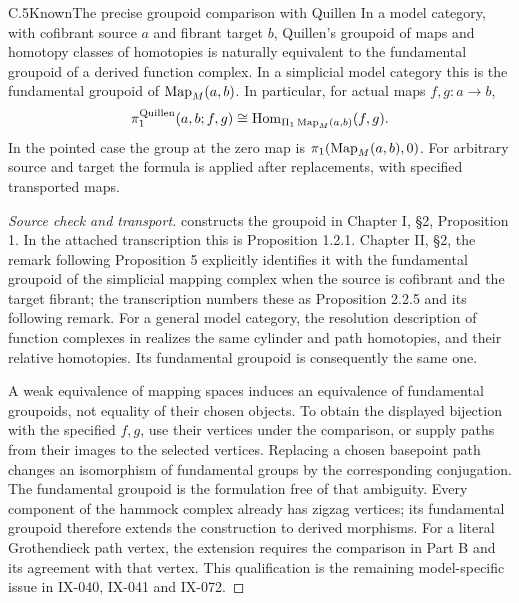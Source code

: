 \begin{result}{C.5}{Known}{The precise groupoid comparison with Quillen}
In a model category, with cofibrant source $a$ and fibrant target $b$, Quillen's groupoid of maps and homotopy classes of homotopies is naturally equivalent to the fundamental groupoid of a derived function complex. In a simplicial model category this is the fundamental groupoid of $\operatorname{Map}_M(a,b)$. In particular, for actual maps $f,g:a\to b$,
\[
 \pi_1^{\mathrm{Quillen}}(a,b;f,g)
 \cong\operatorname{Hom}_{\Pi_1\operatorname{Map}_M(a,b)}(f,g).
\]
In the pointed case the group at the zero map is $\pi_1(\operatorname{Map}_M(a,b),0)$. For arbitrary source and target the formula is applied after replacements, with specified transported maps.
\end{result}
\begin{proof}[Source check and transport]
\citet{Quillen1967} constructs the groupoid in Chapter I, \S2, Proposition 1. In the attached transcription this is Proposition 1.2.1. Chapter II, \S2, the remark following Proposition 5 explicitly identifies it with the fundamental groupoid of the simplicial mapping complex when the source is cofibrant and the target fibrant; the transcription numbers these as Proposition 2.2.5 and its following remark. For a general model category, the resolution description of function complexes in \citet[Proposition 4.4]{DwyerKan1980Function} realizes the same cylinder and path homotopies, and their relative homotopies. Its fundamental groupoid is consequently the same one.

A weak equivalence of mapping spaces induces an equivalence of fundamental groupoids, not equality of their chosen objects. To obtain the displayed bijection with the specified $f,g$, use their vertices under the comparison, or supply paths from their images to the selected vertices. Replacing a chosen basepoint path changes an isomorphism of fundamental groups by the corresponding conjugation. The fundamental groupoid is the formulation free of that ambiguity. Every component of the hammock complex already has zigzag vertices; its fundamental groupoid therefore extends the construction to derived morphisms. For a literal Grothendieck path vertex, the extension requires the comparison in Part B and its agreement with that vertex. This qualification is the remaining model-specific issue in IX-040, IX-041 and IX-072.
\end{proof}

